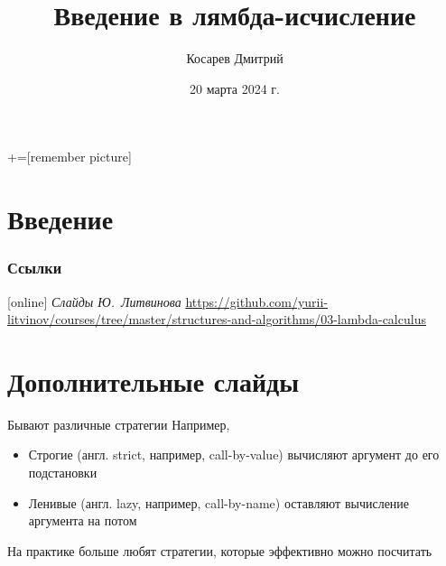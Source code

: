 \documentclass[aspectratio=169
  , xcolor={svgnames}
  , hyperref=
      { colorlinks
      , urlcolor=DarkBlue
      }
  , russian  %
  ]{beamer}
\title[Введение в лямбда-исчисление]{Введение в лямбда-исчисление}
\author{Косарев Дмитрий}
\date{20 марта 2024 г.}
\newcommand{\xarr}[1]{\xrightarrow{\ #1\ }}
\begin{document}
\maketitle

+=[remember picture]

\everymath{\displaystyle}





\section*{Введение}


\begin{frame}%
  \frametitle<presentation>{Ссылки}
  \begin{thebibliography}{10}
[online]
      {\em Слайды Ю.~Литвинова} \newblock\url{https://github.com/yurii-litvinov/courses/tree/master/structures-and-algorithms/03-lambda-calculus}

  \end{thebibliography}
\end{frame}


%

\section{Дополнительные слайды}

\newcommand{\lazy}{\xarr{lazy}}
\newcommand{\strict}{\xarr{strict}}

\begin{frame}{Бывают различные стратегии}
Например,
\begin{itemize}
\item Строгие (англ. strict, например, call-by-value) вычисляют аргумент до его подстановки
\item Ленивые (англ. lazy, например, call-by-name)  оставляют вычисление аргумента на потом
\end{itemize}

На практике больше любят стратегии, которые эффективно можно посчитать
\end{frame}
\end{document}
